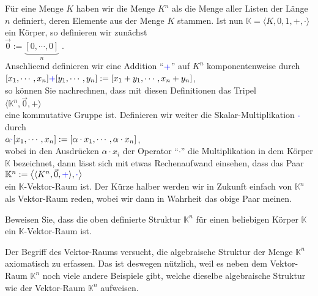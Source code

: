 \example
F\"{u}r eine Menge $K$ haben wir die Menge $K^n$ als die Menge aller Listen der L\"{a}nge $n$ definiert,
deren Elemente aus der Menge $K$ stammen.  Ist nun $\mathbb{K} = \langle K, 0, 1, +, \cdot\rangle$
ein K\"{o}rper, so definieren wir zun\"{a}chst
\\[0.2cm]
\hspace*{1.3cm}
$\vec{0} := \underbrace{[0, \cdots, 0]}_n$ .
\\[0.2cm]
Anschlie\3end definieren wir eine Addition ``${\color{blue}{+}}$'' auf $K^n$ komponentenweise durch
\\[0.2cm]
\hspace*{1.3cm}
$[x_1, \cdots, x_n] {\color{blue}{+}} [y_1, \cdots, y_n] := [x_1 + y_1, \cdots, x_n + y_n]$,
\\[0.2cm]
so k\"{o}nnen Sie nachrechnen, dass mit diesen Definitionen das Tripel
\\[0.2cm]
\hspace*{1.3cm}
$\langle \mathbb{K}^n, \vec{0}, +\rangle$
\\[0.2cm]
eine kommutative Gruppe ist.  Definieren wir weiter die Skalar-Multiplikation
${\color{blue}\cdot}$ durch
\\[0.2cm]
\hspace*{1.3cm}
$\alpha {\color{blue}{\cdot}} [x_1, \cdots, x_n] := [\alpha \cdot x_1, \cdots, \alpha \cdot x_n]$,
\\[0.2cm]
wobei in den Ausdr\"{u}cken $\alpha \cdot x_i$ der Operator ``$\cdot$'' die Multiplikation in dem K\"{o}rper $\mathbb{K}$ bezeichnet,
dann l\"{a}sst sich mit etwas Rechenaufwand einsehen, dass das Paar
\\[0.2cm]
\hspace*{1.3cm}
$\mathbb{K}^n := \bigl\langle \langle K^n, \vec{0}, {\color{blue}{+}} \rangle, {\color{blue}{\cdot}} \bigr\rangle$ 
\\[0.2cm]
ein $\mathbb{K}$-Vektor-Raum ist.  Der K\"{u}rze halber werden wir in Zukunft einfach von $\mathbb{K}^n$ als Vektor-Raum reden, wobei wir dann in Wahrheit das obige Paar meinen. 
\eox

\exercise
Beweisen Sie, dass die oben definierte Struktur $\mathbb{K}^n$ f\"{u}r einen beliebigen K\"{o}rper
$\mathbb{K}$ ein $\mathbb{K}$-Vektor-Raum ist. \eox 


Der Begriff des Vektor-Raums versucht, die algebraische Struktur der Menge $\mathbb{K}^n$
axiomatisch zu erfassen.  Das ist deswegen n\"{u}tzlich, weil es neben dem Vektor-Raum 
$\mathbb{K}^n$ noch viele andere Beispiele gibt, welche dieselbe algebraische
Struktur wie der Vektor-Raum $\mathbb{K}^n$ aufweisen.  


